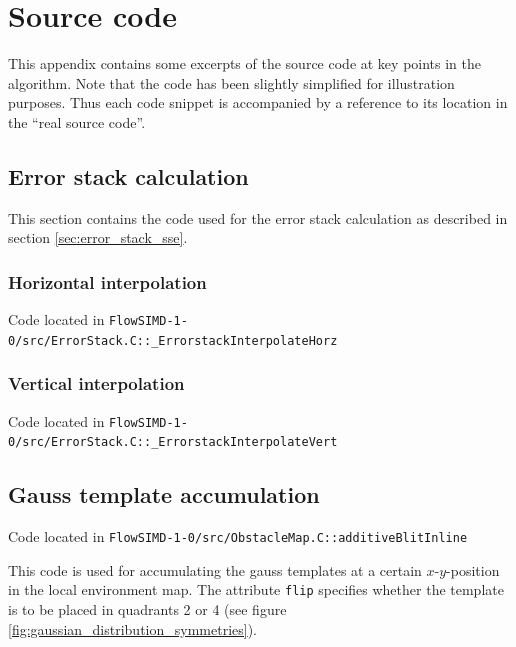 \chapter{Source code}

This appendix contains some excerpts of the source code at key points in the algorithm. Note that the code has been slightly simplified for illustration purposes. Thus each code snippet is accompanied by a reference to its location in the ``real source code''.

\section{Error stack calculation}

This section contains the code used for the error stack calculation as described in section \ref{sec:error_stack_sse}.

\subsection{Horizontal interpolation}

\label{code:horz_interpolation}

{\footnotesize Code located in \texttt{FlowSIMD-1-0/src/ErrorStack.C::\_ErrorstackInterpolateHorz}}



\subsection{Vertical interpolation}

\label{code:vert_interpolation}

{\footnotesize Code located in \texttt{FlowSIMD-1-0/src/ErrorStack.C::\_ErrorstackInterpolateVert}}



\section{Gauss template accumulation}

\label{code:gauss}

{\footnotesize Code located in \texttt{FlowSIMD-1-0/src/ObstacleMap.C::additiveBlitInline}}

This code is used for accumulating the gauss templates at a certain $x$-$y$-position in the local environment map. The attribute \texttt{flip} specifies whether the template is to be placed in quadrants 2 or 4 (see figure \ref{fig:gaussian_distribution_symmetries}).


